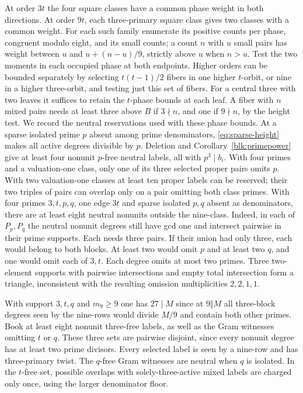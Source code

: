 \documentclass[11pt]{amsart}
\numberwithin{equation}{section}
\theoremstyle{definition}
\theoremstyle{plain}
\begin{document}
At order $3t$ the four square classes have a common phase weight in
both directions. At order $9t$, each three-primary square class gives
two classes with a common weight. For each such family enumerate
its positive counts per phase, congruent modulo eight, and its small
counts; a count $n$ with $u$ small pairs has weight between $u$ and
$u+(n-u)/9$, strictly above $u$ when $n>u$. Test the two moments in
each occupied phase at both endpoints. Higher orders can be bounded
separately by selecting $t(t-1)/2$ fibers in one higher $t$-orbit,
or nine in a higher three-orbit, and testing just this set of fibers.
For a central three with two leaves it suffices to retain the
$t$-phase bounds at each leaf. A fiber with $n$ mixed pairs needs at
least three above $B$ if $3\nmid n$, and one if $9\nmid n$, by the
height test. We record the neutral reservations used with these phase bounds.
At a sparse isolated prime $p$ absent among prime denominators,
\eqref{eq:sparse-height} makes all active degrees divisible by $p$.
Deletion and Corollary~\ref{blk:primepower} give at least four nonunit
$p$-free neutral labels, all with $p^3\mid b_i$. With four primes
and a valuation-one class, only one of its three selected proper
pairs omits $p$. With two valuation-one classes at least ten proper
labels can be reserved; their two triples of pairs can overlap only
on a pair omitting both class primes. With four primes $3,t,p,q$,
one edge $3t$ and sparse isolated $p,q$ absent as denominators,
there are at least eight neutral nonunits outside the nine-class.
Indeed, in each of $P_p,P_q$ the neutral nonunit degrees still have
gcd one and intersect pairwise in their prime supports. Each needs
three pairs. If their union had only three, each would belong to
both blocks. At least two would omit $p$ and at least two $q$,
and one would omit each of $3,t$. Each degree omits at most two
primes. Three two-element supports with pairwise intersections and
empty total intersection form a triangle, inconsistent with the
resulting omission multiplicities $2,2,1,1$.

With support $3,t,q$ and $m_9\ge9$ one has $27\mid M$ since
at $9\Vert M$ all three-block degrees seen by the nine-rows would
divide $M/9$ and contain both other primes. Book at least eight
nonunit three-free labels, as well as the Gram witnesses omitting
$t$ or $q$. These three sets are pairwise disjoint, since every
nonunit degree has at least two prime divisors. Every selected label
is seen by a nine-row and has three-primary twist. The $q$-free Gram
witnesses are neutral when $q$ is isolated. In the $t$-free set,
possible overlaps with solely-three-active mixed labels are charged
only once, using the larger denominator floor.
\end{document}
